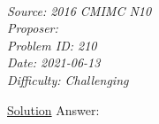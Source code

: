 \SSbreak\\
\emph{Source: 2016 CMIMC N10}\\
\emph{Proposer: \Paiya}\\ %
\emph{Problem ID: 210}\\
\emph{Date: 2021-06-13}\\
\emph{Difficulty: Challenging}\\
\SSbreak
 
\bigskip

\begin{solution}\hfil\medskip
	
    \href{http://cmimc-official.herokuapp.com/docs/past-tests/2016_NumberTheory_S.pdf}{Solution} Answer: 
\end{solution}\bigskip
